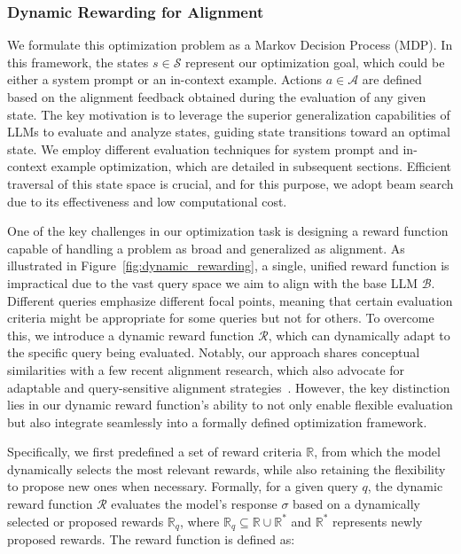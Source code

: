 \subsubsection{Dynamic Rewarding for Alignment}

We formulate this optimization problem as a Markov Decision Process (MDP). In this framework, the states $s\in \mathcal{S}$ represent our optimization goal, which could be either a system prompt or an in-context example. Actions $a \in \mathcal{A}$ are defined based on the alignment feedback obtained during the evaluation of any given state. The key motivation is to leverage the superior generalization capabilities of LLMs to evaluate and analyze states, guiding state transitions toward an optimal state. We employ different evaluation techniques for system prompt and in-context example optimization, which are detailed in subsequent sections. Efficient traversal of this state space is crucial, and for this purpose, we adopt beam search due to its effectiveness and low computational cost.


One of the key challenges in our optimization task is designing a reward function capable of handling a problem as broad and generalized as alignment. As illustrated in Figure~\ref{fig:dynamic_rewarding}, a single, unified reward function is impractical due to the vast query space we aim to align with the base LLM $\mathcal{B}$. Different queries emphasize different focal points, meaning that certain evaluation criteria might be appropriate for some queries but not for others. To overcome this, we introduce a dynamic reward function $\mathcal{R}$, which can dynamically adapt to the specific query being evaluated. Notably, our approach shares conceptual similarities with a few recent alignment research, which also advocate for adaptable and query-sensitive alignment strategies~\cite{bai2022constitutional, sun2024principle}. However, the key distinction lies in our dynamic reward function’s ability to not only enable flexible evaluation but also integrate seamlessly into a formally defined optimization framework.



Specifically, we first predefined a set of reward criteria $\mathbb{R}$, from which the model dynamically selects the most relevant rewards, while also retaining the flexibility to propose new ones when necessary. Formally, for a given query \( q \), the dynamic reward function $\mathcal{R}$ evaluates the model's response $\sigma$ based on a dynamically selected or proposed rewards $\mathbb{R}_q$, where $\mathbb{R}_q \subseteq \mathbb{R} \cup \mathbb{R}^*$ and $\mathbb{R}^*$ represents newly proposed rewards. The reward function is defined as:

